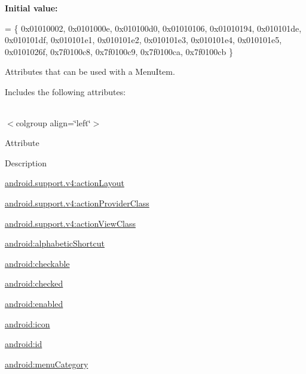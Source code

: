 {\bfseries Initial value\+:}
\begin{DoxyCode}
= \{
            0x01010002, 0x0101000e, 0x010100d0, 0x01010106,
            0x01010194, 0x010101de, 0x010101df, 0x010101e1,
            0x010101e2, 0x010101e3, 0x010101e4, 0x010101e5,
            0x0101026f, 0x7f0100c8, 0x7f0100c9, 0x7f0100ca,
            0x7f0100cb
        \}
\end{DoxyCode}
Attributes that can be used with a Menu\+Item. 

Includes the following attributes\+:

\tabulinesep=1mm
\begin{longtabu} spread 0pt [c]{*{0}{|X[-1]}|}
\hline
\end{longtabu}
$<$colgroup align=\char`\"{}left\char`\"{}$>$ 

Attribute

Description 

{\ttfamily \hyperlink{classandroid_1_1support_1_1v4_1_1R_1_1styleable_af194808a4ba1c7a693afbd147948aeb5}{android.\+support.\+v4\+:action\+Layout}}

{\ttfamily \hyperlink{classandroid_1_1support_1_1v4_1_1R_1_1styleable_ae90ac3b2f2bea80a71d360cb82e35219}{android.\+support.\+v4\+:action\+Provider\+Class}}

{\ttfamily \hyperlink{classandroid_1_1support_1_1v4_1_1R_1_1styleable_a083070b1aa74ecfc2abe1a5349047c5c}{android.\+support.\+v4\+:action\+View\+Class}}

{\ttfamily \hyperlink{classandroid_1_1support_1_1v4_1_1R_1_1styleable_a3cf2935e744fb9f942bad0c47703e631}{android\+:alphabetic\+Shortcut}}

{\ttfamily \hyperlink{classandroid_1_1support_1_1v4_1_1R_1_1styleable_ae164f5c1d244ba85f9dd11fcbd4c1852}{android\+:checkable}}

{\ttfamily \hyperlink{classandroid_1_1support_1_1v4_1_1R_1_1styleable_ade997ec68b8ea842ccd85dcddfdaa360}{android\+:checked}}

{\ttfamily \hyperlink{classandroid_1_1support_1_1v4_1_1R_1_1styleable_aabc00563415e16b30ecedaf11d6d9eb7}{android\+:enabled}}

{\ttfamily \hyperlink{classandroid_1_1support_1_1v4_1_1R_1_1styleable_a3e063bea4cd93ef6a4f2e77cf1d904d4}{android\+:icon}}

{\ttfamily \hyperlink{classandroid_1_1support_1_1v4_1_1R_1_1styleable_a2fb5698551ba92fc84a909e0e0707a7b}{android\+:id}}

{\ttfamily \hyperlink{classandroid_1_1support_1_1v4_1_1R_1_1styleable_a8ac9469c005cff049480dd49956827cf}{android\+:menu\+Category}}

